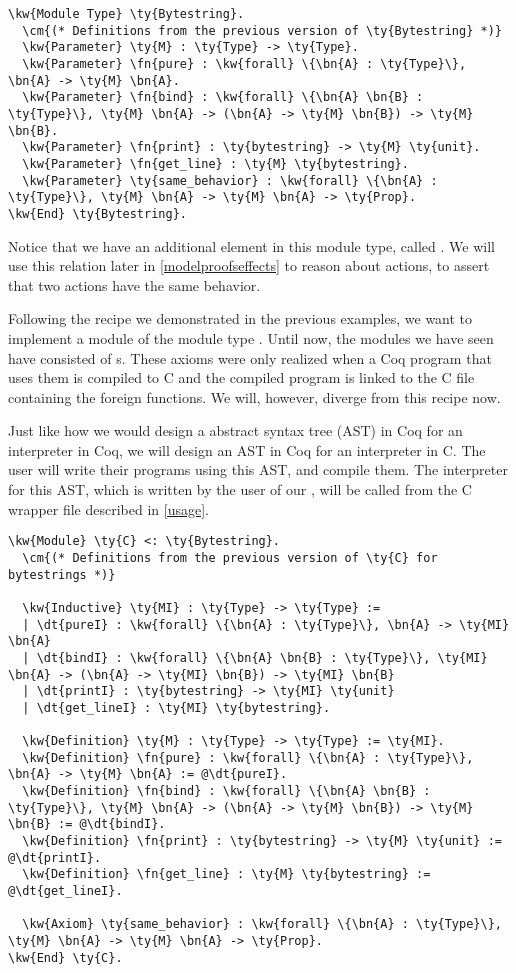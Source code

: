 \begin{Verbatim}
\kw{Module Type} \ty{Bytestring}.
  \cm{(* Definitions from the previous version of \ty{Bytestring} *)}
  \kw{Parameter} \ty{M} : \ty{Type} -> \ty{Type}.
  \kw{Parameter} \fn{pure} : \kw{forall} \{\bn{A} : \ty{Type}\}, \bn{A} -> \ty{M} \bn{A}.
  \kw{Parameter} \fn{bind} : \kw{forall} \{\bn{A} \bn{B} : \ty{Type}\}, \ty{M} \bn{A} -> (\bn{A} -> \ty{M} \bn{B}) -> \ty{M} \bn{B}.
  \kw{Parameter} \fn{print} : \ty{bytestring} -> \ty{M} \ty{unit}.
  \kw{Parameter} \fn{get_line} : \ty{M} \ty{bytestring}.
  \kw{Parameter} \ty{same_behavior} : \kw{forall} \{\bn{A} : \ty{Type}\}, \ty{M} \bn{A} -> \ty{M} \bn{A} -> \ty{Prop}.
\kw{End} \ty{Bytestring}.
\end{Verbatim}

Notice that we have an additional element in this module type, called . We will use this relation later in \autoref{modelproofseffects} to reason about actions, to assert that two actions have the same behavior.


Following the recipe we demonstrated in the previous examples, we want to implement a  module of the module type . Until now, the  modules we have seen have consisted of s. These axioms were only realized when a Coq program that uses them is compiled to C and the compiled program is linked to the C file containing the \gls{foreign function}s. We will, however, diverge from this recipe now.

Just like how we would design a abstract syntax tree (AST) in Coq for an interpreter in Coq, we will design an AST in Coq for an interpreter in C. The user will write their programs using this AST, and compile them. The interpreter for this AST, which is written by the user of our \ffi{}, will be called from the C wrapper file described in \autoref{usage}.

\begin{Verbatim}
\kw{Module} \ty{C} <: \ty{Bytestring}.
  \cm{(* Definitions from the previous version of \ty{C} for bytestrings *)}

  \kw{Inductive} \ty{MI} : \ty{Type} -> \ty{Type} :=
  | \dt{pureI} : \kw{forall} \{\bn{A} : \ty{Type}\}, \bn{A} -> \ty{MI} \bn{A}
  | \dt{bindI} : \kw{forall} \{\bn{A} \bn{B} : \ty{Type}\}, \ty{MI} \bn{A} -> (\bn{A} -> \ty{MI} \bn{B}) -> \ty{MI} \bn{B}
  | \dt{printI} : \ty{bytestring} -> \ty{MI} \ty{unit}
  | \dt{get_lineI} : \ty{MI} \ty{bytestring}.

  \kw{Definition} \ty{M} : \ty{Type} -> \ty{Type} := \ty{MI}.
  \kw{Definition} \fn{pure} : \kw{forall} \{\bn{A} : \ty{Type}\}, \bn{A} -> \ty{M} \bn{A} := @\dt{pureI}.
  \kw{Definition} \fn{bind} : \kw{forall} \{\bn{A} \bn{B} : \ty{Type}\}, \ty{M} \bn{A} -> (\bn{A} -> \ty{M} \bn{B}) -> \ty{M} \bn{B} := @\dt{bindI}.
  \kw{Definition} \fn{print} : \ty{bytestring} -> \ty{M} \ty{unit} := @\dt{printI}.
  \kw{Definition} \fn{get_line} : \ty{M} \ty{bytestring} := @\dt{get_lineI}.

  \kw{Axiom} \ty{same_behavior} : \kw{forall} \{\bn{A} : \ty{Type}\}, \ty{M} \bn{A} -> \ty{M} \bn{A} -> \ty{Prop}.
\kw{End} \ty{C}.
\end{Verbatim}

